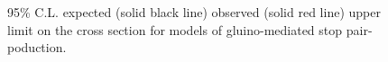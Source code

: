 \begin{figure}
  \caption{95\% C.L. expected (solid black line) observed (solid red line) upper limit on the cross section for models of gluino-mediated stop pair-poduction.\label{fig:plane_xs_gluinoToStop}}
  \begin{center}    
     ~~
     \\
     ~~
  \end{center}
\end{figure}

